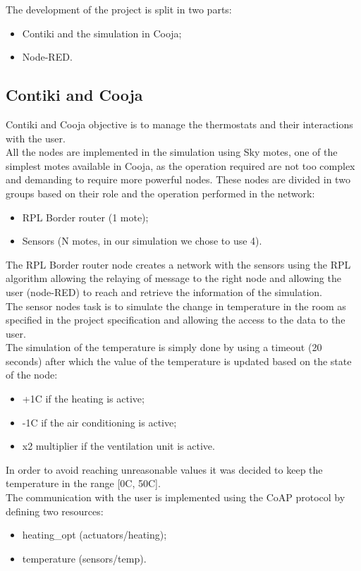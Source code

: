 The development of the project is split in two parts:
\begin{itemize}
	\item Contiki and the simulation in Cooja;
	\item Node-RED.
\end{itemize}

\subsection*{Contiki and Cooja}
Contiki and Cooja objective is to manage the thermostats and their interactions with the user.\\
All the nodes are implemented in the simulation using Sky motes, one of the simplest motes available in Cooja, as the operation required are not too complex and demanding to require more powerful nodes. These nodes are divided in two groups based on their role and the operation performed in the network:
\begin{itemize}
	\item RPL Border router (1 mote);
	\item Sensors (N motes, in our simulation we chose to use 4).
\end{itemize}

The RPL Border router node creates a network with the sensors using the RPL algorithm allowing the relaying of message to the right node and allowing the user (node-RED) to reach and retrieve the information of the simulation.\\

The sensor nodes task is to simulate the change in temperature in the room as specified in the project specification and allowing the access to the data to the user.\\
The simulation of the temperature is simply done by using a timeout (20 seconds) after which the value of the temperature is updated based on the state of the node:
\begin{itemize}
	\item +1\textdegree C if the heating is active;
	\item -1\textdegree C if the air conditioning is active;
	\item x2 multiplier if the ventilation unit is active.
\end{itemize} 
In order to avoid reaching unreasonable values it was decided to keep the temperature in the range [0\textdegree C, 50\textdegree C].\\
The communication with the user is implemented using the CoAP protocol by defining two resources:
\begin{itemize}
	\item heating\_opt (actuators/heating);
	\item temperature (sensors/temp).
\end{itemize}

